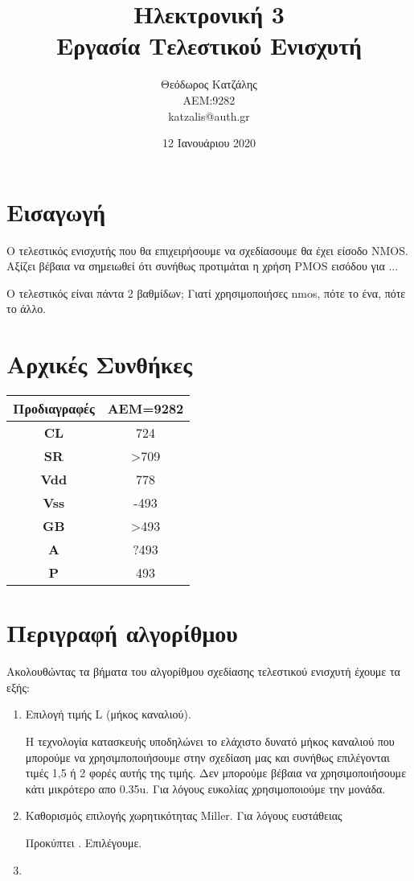 \documentclass[12pt, a4paper]{article}
\title{\textbf{Ηλεκτρονική 3} \\ \textbf{Εργασία Τελεστικού Ενισχυτή}}
\author{Θεόδωρος Κατζάλης \\ ΑΕΜ:9282 \\ katzalis@auth.gr}
\date{12 Ιανουάριου 2020}
\begin{document}
	
	\maketitle
	\sloppy
	\tableofcontents
	\pagebreak
	
	\section{Εισαγωγή}
	
	Ο τελεστικός ενισχυτής που θα επιχειρήσουμε να σχεδίασουμε θα έχει είσοδο ΝMOS. Αξίζει βέβαια να σημειωθεί ότι συνήθως προτιμάται η χρήση PMOS εισόδου για ...
	
	Ο τελεστικός είναι πάντα 2 βαθμίδων; Γιατί χρησιμοποιήσες nmos, πότε το ένα, πότε το άλλο.
	
	\section{Αρχικές Συνθήκες}
	
	
	\begin{table}[h!]
		\centering
		\begin{tabular}{|c|c|}
			\hline
			Προδιαγραφές & AEM=9282  \\
			\hline
			\textbf{CL} & 724 \\
			\hline
			\textbf{SR} & >709 \\
			\hline
			\textbf{Vdd} & 778 \\
			\hline
			\textbf{Vss} & -493 \\
			\hline
			\textbf{GB} & >493 \\
			\hline
			\textbf{A} & ?493 \\
			\hline
			\textbf{P} & 493 \\
			\hline
		\end{tabular}
	\end{table}
	
	\section{Περιγραφή αλγορίθμου}
	
	Ακολουθώντας τα βήματα του αλγορίθμου σχεδίασης τελεστικού ενισχυτή έχουμε τα εξής:
	\begin{enumerate}
		\item Επιλογή τιμής L (μήκος καναλιού). 
		
		Η τεχνολογία κατασκευής υποδηλώνει το ελάχιστο δυνατό μήκος καναλιού που μπορούμε να χρησιμποποιήσουμε στην σχεδίαση μας και συνήθως επιλέγονται τιμές 1,5 ή 2 φορές αυτής της τιμής. Δεν μπορούμε βέβαια να χρησιμοποιήσουμε κάτι μικρότερο απο 0.35u. Για λόγους ευκολίας χρησιμοποιούμε την μονάδα.
		
		
		\item Καθορισμός επιλογής χωρητικότητας Miller. Για λόγους ευστάθειας
		
		Προκύπτει . Επιλέγουμε.
		
		\item
	\end{enumerate}
\end{document}
